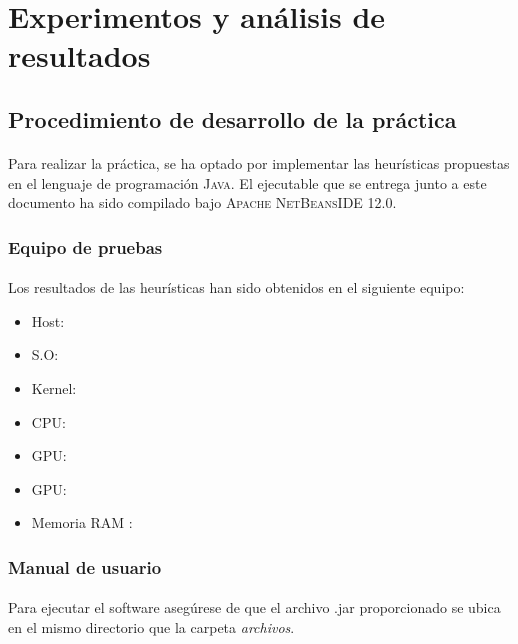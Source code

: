 \section{Experimentos y análisis de resultados}
	
	\subsection{Procedimiento de desarrollo de la práctica}
	
	\paragraph{}Para realizar la práctica, se ha optado por implementar las heurísticas propuestas en el lenguaje de programación \textsc{Java}. El ejecutable que se entrega junto a este documento ha sido compilado bajo \textsc{ Apache NetBeansIDE 12.0}.
	
	\subsubsection{Equipo de pruebas}
	
	\paragraph{}Los resultados de las heurísticas han sido obtenidos en el siguiente equipo:
	
		\begin{itemize}
			
			\item Host:
			\item S.O:
			\item Kernel:
			\item CPU:
			\item GPU:
			\item GPU:
			\item Memoria RAM :
			
		\end{itemize}

	\subsubsection{Manual de usuario}
	
		\paragraph{}Para ejecutar el software asegúrese de que el archivo .jar proporcionado se ubica en el mismo directorio que la carpeta \emph{archivos}. 
		
